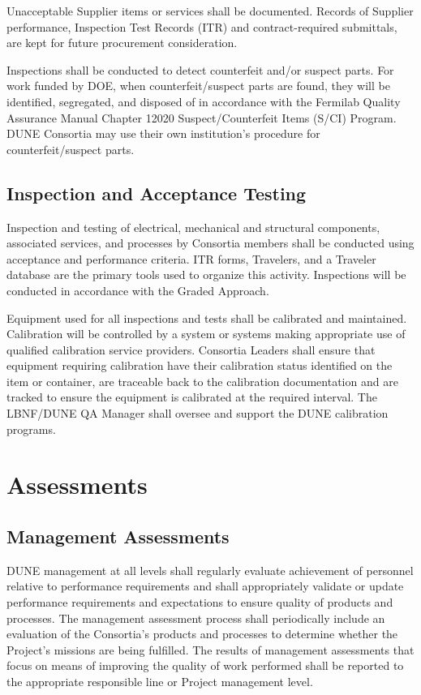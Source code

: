 Unacceptable Supplier items or services shall be documented. Records
of Supplier performance, Inspection Test Records (ITR) and
contract-required submittals, are kept for future procurement
consideration.

Inspections shall be conducted to detect counterfeit and/or suspect
parts. For work funded by DOE, when counterfeit/suspect parts are
found, they will be identified, segregated, and disposed of in
accordance with the Fermilab Quality Assurance Manual Chapter 12020
Suspect/Counterfeit Items (S/CI) Program. DUNE Consortia may use their
own institution’s procedure for counterfeit/suspect parts.

\subsection{Inspection and Acceptance Testing}

Inspection and testing of electrical, mechanical and structural
components, associated services, and processes by Consortia members
shall be conducted using acceptance and performance criteria. ITR
forms, Travelers, and a Traveler database are the primary tools used
to organize this activity. Inspections will be conducted in accordance
with the Graded Approach.

Equipment used for all inspections and tests shall be calibrated and
maintained. Calibration will be controlled by a system or systems
making appropriate use of qualified calibration service
providers. Consortia Leaders shall ensure that equipment requiring
calibration have their calibration status identified on the item or
container, are traceable back to the calibration documentation and are
tracked to ensure the equipment is calibrated at the required
interval. The LBNF/DUNE QA Manager shall oversee and support the DUNE
calibration programs.

\section{Assessments}

\subsection{Management Assessments}

DUNE management at all levels shall regularly evaluate achievement of
personnel relative to performance requirements and shall appropriately
validate or update performance requirements and expectations to ensure
quality of products and processes. The management assessment process
shall periodically include an evaluation of the Consortia's products
and processes to determine whether the Project's missions are being
fulfilled. The results of management assessments that focus on means
of improving the quality of work performed shall be reported to the
appropriate responsible line or Project management level.

